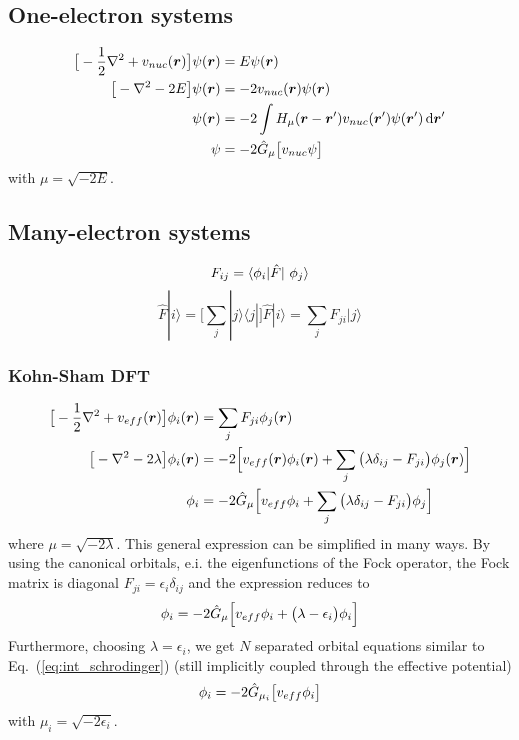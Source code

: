 \subsection{One-electron systems}
\begin{align}
    \big[-\frac{1}{2}\nabla^2+v_{nuc}(\boldsymbol r)\big]\psi(\boldsymbol r) &= E \psi(\boldsymbol r)\\
    \big[-\nabla^2 - 2E\big]\psi(\boldsymbol r) &= -2v_{nuc}(\boldsymbol r) \psi(\boldsymbol r)\\
    \psi(\boldsymbol r) &= -2\int H_{\mu}(\boldsymbol r-\boldsymbol r')v_{nuc}(\boldsymbol r') 
	\psi(\boldsymbol r') \,\mathrm{d} \boldsymbol r'\\
    \label{eq:int_schrodinger}
    \psi &= -2 \hat{G}_{\mu}\big[v_{nuc}\psi\big]
\end{align}
with $\mu = \sqrt{-2E}$.


\subsection{Many-electron systems}

\begin{equation}
    F_{ij} = \langle \orbital_i | \hat{F} | \orbital_j \rangle
\end{equation}
\begin{equation}
    \hat{F}| i \rangle	
	= \Big[\sum_j |j \rangle\langle j|\Big] \hat{F}|i \rangle 
	= \sum_j F_{ji} |j \rangle
\end{equation}

\subsubsection{Kohn-Sham DFT}
\begin{align}
    \big[-\frac{1}{2}\nabla^2+v_{eff}(\boldsymbol r)\big]\phi_i(\boldsymbol r) 
	    &= \sum_j F_{ji} \phi_j(\boldsymbol r)\\
    \big[-\nabla^2 - 2\lambda\big]\phi_i(\boldsymbol r) &= -2\Big[v_{eff}(\boldsymbol r) \phi_i(\boldsymbol r)
	    + \sum_j \big(\lambda\delta_{ij} - F_{ji}\big) \phi_j(\boldsymbol r)\Big]\\
    \phi_i &= -2\hat{G}_\mu\Big[v_{eff} \phi_i + 
	\sum_j \big(\lambda\delta_{ij} - F_{ji}\big) \phi_j\Big]
\end{align}
where $\mu = \sqrt{-2\lambda}$. This general expression can be simplified in many ways.
By using the canonical orbitals, e.i. the eigenfunctions of the Fock operator, the 
Fock matrix is diagonal $F_{ji} = \epsilon_i\delta_{ij}$ and the expression reduces to
\begin{equation}
    \phi_i = -2\hat{G}_\mu\Big[v_{eff} \phi_i + 
	\big(\lambda - \epsilon_{i}\big) \phi_i\Big]
\end{equation}
Furthermore, choosing $\lambda = \epsilon_i$, we get $N$ separated orbital equations similar 
to Eq.~(\ref{eq:int_schrodinger}) (still implicitly coupled through the effective potential)
\begin{equation}
    \phi_i = -2 \hat{G}_{\mu_i}\big[v_{eff}\phi_i\big]
\end{equation}
with $\mu_i = \sqrt{-2\epsilon_i}$.


